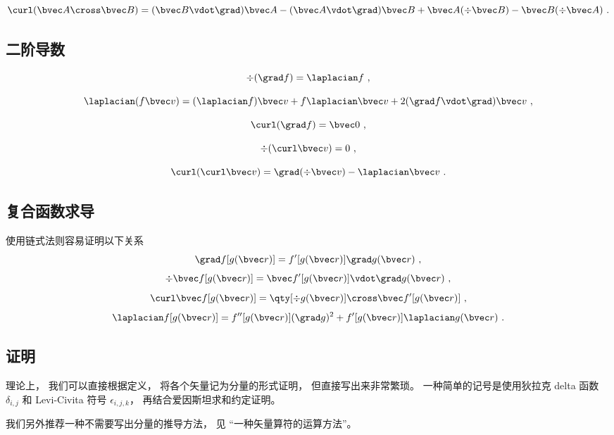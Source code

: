 \begin{equation}\label{eq_VopEq_6}
\curl (\bvec A \cross \bvec B) = (\bvec B \vdot \grad) \bvec A - (\bvec A \vdot \grad) \bvec B + \bvec A (\div \bvec B) - \bvec B (\div \bvec A)~.
\end{equation}

\subsection{二阶导数}

\begin{equation}
\div (\grad f) = \laplacian f~,
\end{equation}

\begin{equation}\label{eq_VopEq_5}
\laplacian (f \bvec v) = (\laplacian f)\bvec v + f \laplacian \bvec v + 2 (\grad f \vdot \grad) \bvec v~,
\end{equation}

\begin{equation}
\curl (\grad f) = \bvec 0~,
\end{equation}

\begin{equation}
\div (\curl \bvec v) = 0~,
\end{equation}

\begin{equation}\label{eq_VopEq_7}
\curl(\curl \bvec v) = \grad(\div\bvec v) - \laplacian \bvec v~.
\end{equation}

\subsection{复合函数求导}
使用链式法则容易证明以下关系
\begin{equation}
\grad f[g(\bvec r)] = f'[g(\bvec r)] \grad g(\bvec r)~,
\end{equation}
\begin{equation}
\div \bvec f[g(\bvec r)] = \bvec f'[g(\bvec r)] \vdot \grad g(\bvec r)~,
\end{equation}
\begin{equation}
\curl \bvec f[g(\bvec r)] = \qty[\div g(\bvec r)] \cross \bvec f'[g(\bvec r)]~,
\end{equation}
\begin{equation}
\laplacian f[g(\bvec r)] = f''[g(\bvec r)] (\grad g)^2 + f'[g(\bvec r)] \laplacian g(\bvec r)~.
\end{equation}

\subsection{证明}
理论上， 我们可以直接根据定义， 将各个矢量记为分量的形式证明， 但直接写出来非常繁琐。 一种简单的记号是使用狄拉克 delta 函数 $\delta_{i,j}$ 和 Levi-Civita 符号 $\epsilon_{i,j,k}$， 再结合爱因斯坦求和约定证明。

我们另外推荐一种不需要写出分量的推导方法， 见 “一种矢量算符的运算方法”。
